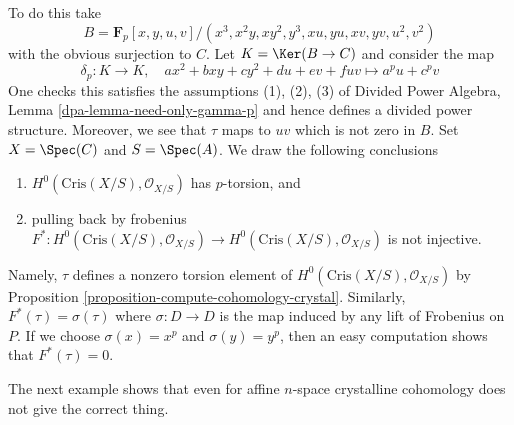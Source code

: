 \begin{example}
To do this take
$$
B = \mathbf{F}_p[x, y, u, v]/(x^3, x^2y, xy^2, y^3, xu, yu, xv, yv, u^2, v^2)
$$
with the obvious surjection to $C$. Let $K = \Ker(B \to C)$ and
consider the map
$$
\delta_p : K \longrightarrow K,\quad
ax^2 + bxy + cy^2 + du + ev + fuv \longmapsto a^pu + c^pv
$$
One checks this satisfies the assumptions (1), (2), (3) of
Divided Power Algebra, Lemma \ref{dpa-lemma-need-only-gamma-p}
and hence defines a divided power structure. Moreover,
we see that $\tau$ maps to $uv$ which is not zero in $B$.
Set $X = \Spec(C)$ and $S = \Spec(A)$.
We draw the following conclusions
\begin{enumerate}
\item $H^0(\text{Cris}(X/S), \mathcal{O}_{X/S})$ has $p$-torsion, and
\item pulling back by frobenius $F^* : H^0(\text{Cris}(X/S), \mathcal{O}_{X/S})
\to H^0(\text{Cris}(X/S), \mathcal{O}_{X/S})$ is not injective.
\end{enumerate}
Namely, $\tau$ defines a nonzero torsion element of
$H^0(\text{Cris}(X/S), \mathcal{O}_{X/S})$ by
Proposition \ref{proposition-compute-cohomology-crystal}.
Similarly, $F^*(\tau) = \sigma(\tau)$ where $\sigma : D \to D$ is the
map induced by any lift of Frobenius on $P$. If we choose $\sigma(x) = x^p$
and $\sigma(y) = y^p$, then an easy computation shows that $F^*(\tau) = 0$.
\end{example}

\noindent
The next example shows that even for affine $n$-space crystalline
cohomology does not give the correct thing.

